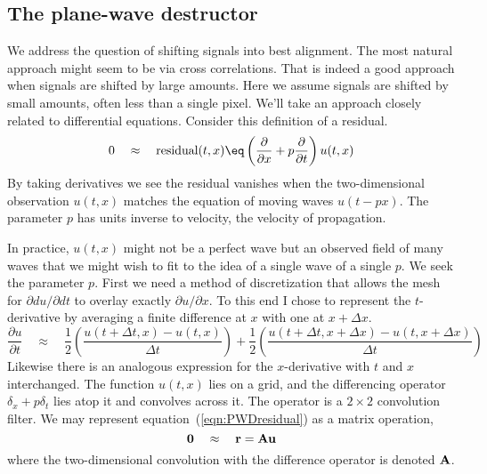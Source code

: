 %

\subsection{The plane-wave destructor}
%
We address the question of shifting signals into best alignment. The
most natural approach might seem to be via cross correlations.  That
is indeed a good approach when signals are shifted by large amounts.
Here we assume signals are shifted by small amounts, often less than a
single pixel.  We'll take an approach closely related to differential
equations. Consider this definition of a residual.
\begin{equation}
0 \quad \approx \quad \hbox{residual}(t,x) \eq \left( \frac{\partial}{\partial x} + p \frac{\partial}{\partial t} \right) u(t,x)
\label{eqn:PWDresidual}
\end{equation}
By taking derivatives we see the residual vanishes when the two-dimensional observation $u(t,x)$ matches the equation of moving waves $u(t-px)$.  The parameter $p$ has units inverse to velocity, the velocity of propagation. 
\par
In practice, $u(t,x)$ might not be a perfect wave but an observed field of many waves that we might wish to fit to the idea of a single wave of a single $p$. We seek the parameter $p$.  First we need a method of discretization that allows the mesh for $\partial du/\partial dt$ to overlay exactly $\partial u /\partial x$.  To this end I chose to represent the $t$-derivative by averaging a finite difference at $x$ with one at $x+\Delta x$. 
\begin{equation}
\frac{\partial u}{\partial t} \quad \approx \quad \frac{1}{2} 
\left(
\frac{u(t+\Delta t,x) - u(t,x) }{\Delta t}
\right) + \frac{1}{2}
\left(
\frac{u(t+\Delta t,x+\Delta x) - u(t,x+\Delta x) }{\Delta t}
\right)
\end{equation}
Likewise there is an analogous expression for the $x$-derivative with $t$ and $x$ interchanged.
The function $u(t,x)$ lies on a grid, and the
differencing operator $\delta_x + p\delta_t$ lies atop it and convolves across it.
The operator is a $2\times 2$ convolution filter.
We may represent equation~(\ref{eqn:PWDresidual}) as a matrix operation,
\begin{equation}
{\bf 0} \quad \approx\quad  {\bf r} = {\bf A}{\bf u}
\end{equation}
where the two-dimensional convolution with the difference operator is denoted ${\bf A}$.
\par
